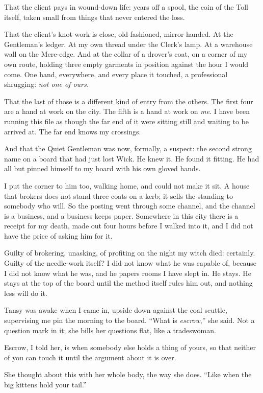 That the client pays in wound-down life: years off a spool, the coin of the Toll itself, taken small from things that never entered the loss.

That the client's knot-work is close, old-fashioned, mirror-handed. At the Gentleman's ledger. At my own thread under the Clerk's lamp. At a warehouse wall on the Mere-edge. And at the collar of a drover's coat, on a corner of my own route, holding three empty garments in position against the hour I would come. One hand, everywhere, and every place it touched, a professional shrugging: \emph{not one of ours.}

That the last of those is a different kind of entry from the others. The first four are a hand at work on the city. The fifth is a hand at work on \emph{me}. I have been running this file as though the far end of it were sitting still and waiting to be arrived at. The far end knows my crossings.

And that the Quiet Gentleman was now, formally, a suspect: the second strong name on a board that had just lost Wick. He knew it. He found it fitting. He had all but pinned himself to my board with his own gloved hands.

I put the corner to him too, walking home, and could not make it sit. A house that brokers does not stand three coats on a kerb; it sells the standing to somebody who will. So the posting went through some channel, and the channel is a business, and a business keeps paper. Somewhere in this city there is a receipt for my death, made out four hours before I walked into it, and I did not have the price of asking him for it.

Guilty of brokering, unasking, of profiting on the night my witch died: certainly. Guilty of the needle-work itself? I did not know what he was capable of, because I did not know what he was, and he papers rooms I have slept in. He stays. He stays at the top of the board until the method itself rules him out, and nothing less will do it.

Tansy was awake when I came in, upside down against the coal scuttle, supervising me pin the morning to the board. ``What is \emph{escrow},'' she said. Not a question mark in it; she bills her questions flat, like a tradeswoman.

Escrow, I told her, is when somebody else holds a thing of yours, so that neither of you can touch it until the argument about it is over.

She thought about this with her whole body, the way she does. ``Like when the big kittens hold your tail.''

